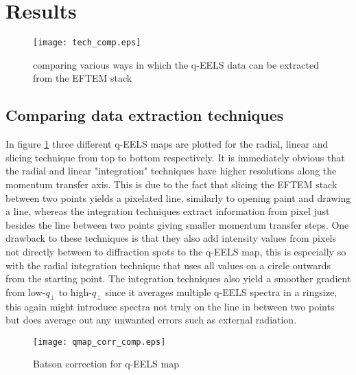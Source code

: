 \section{Results}
\begin{figure}[h!]
	\centering
	\texttt{[image: tech\_comp.eps]}
	\caption{comparing various ways in which the q-EELS data can be extracted from the EFTEM stack}
	\label{fig:tech-comp}
\end{figure}%
%
\subsection{Comparing data extraction techniques}
In figure \ref{fig:tech-comp} three different q-EELS maps are plotted for the radial, linear and slicing technique from top to bottom respectively. It is immediately obvious that the radial and linear "integration" techniques have higher resolutions along the momentum transfer axis. This is due to the fact that slicing the EFTEM stack between two points yields a pixelated line, similarly to opening paint and drawing a line, whereas the integration techniques extract information from pixel just besides the line between two points giving smaller momentum transfer steps. One drawback to these techniques is that they also add intensity values from pixels not directly between to diffraction spots to the q-EELS map, this is especially so with the radial integration technique that uses all values on a circle outwards from the starting point.
The integration techniques also yield a smoother gradient from low-$q_{\perp}$ to high-$q_{\perp}$ since it averages multiple q-EELS spectra in a ringsize, this again might introduce spectra not truly on the line in between two points but does average out any unwanted errors such as external radiation.\\
\newpage%
%
\begin{figure}[h!]
	\centering
	\texttt{[image: qmap\_corr\_comp.eps]}
	\caption{Batson correction for q-EELS map}
	\label{fig:bat-cor}
\end{figure}
